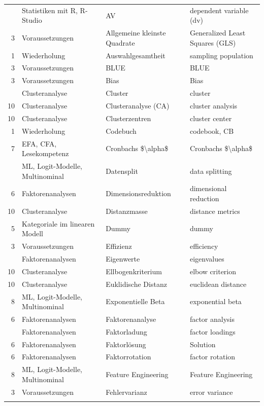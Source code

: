 \documentclass[
  10pt,
  letterpaper,
  a4paper, twoside]{scrreprt}
\begin{document}
\begin{longtable*}{rlll}
\endfoot
\bottomrule
{} & Statistiken mit R, R-Studio & AV & dependent variable (dv)\\
3 & Voraussetzungen & Allgemeine kleinste Quadrate & Generalized Least Squares (GLS)\\
1 & Wiederholung & Auswahlgesamtheit & sampling population\\
3 & Voraussetzungen & BLUE & BLUE\\
3 & Voraussetzungen & Bias & Bias\\
 & Clusteranalyse & Cluster & cluster\\
10 & Clusteranalyse & Clusteranalyse (CA) & cluster analysis\\
10 & Clusteranalyse & Clusterzentren & cluster center\\
1 & Wiederholung & Codebuch & codebook, CB\\
7 & EFA, CFA, Lesekompetenz & Cronbachs \$\textbackslash{}alpha\$ & Cronbachs \$\textbackslash{}alpha\$\\
 & ML, Logit-Modelle, Multinominal & Datensplit & data splitting\\
6 & Faktorenanalysen & Dimensionsreduktion & dimensional reduction\\
10 & Clusteranalyse & Distanzmasse & distance metrics\\
5 & Kategoriale im linearen Modell & Dummy & dummy\\
3 & Voraussetzungen & Effizienz & efficiency\\
 & Faktorenanalysen & Eigenwerte & eigenvalues\\
10 & Clusteranalyse & Ellbogenkriterium & elbow criterion\\
10 & Clusteranalyse & Euklidische Distanz & euclidean distance\\
8 & ML, Logit-Modelle, Multinominal & Exponentielle Beta & exponential beta\\
6 & Faktorenanalysen & Faktorenanalyse & factor analysis\\
 & Faktorenanalysen & Faktorladung & factor loadings\\
6 & Faktorenanalysen & Faktorlösung & Solution\\
6 & Faktorenanalysen & Faktorrotation & factor rotation\\
8 & ML, Logit-Modelle, Multinominal & Feature Engineering & Feature Engineering\\
3 & Voraussetzungen & Fehlervarianz & error variance\\
\addlinespace

\end{longtable*}
\end{document}
